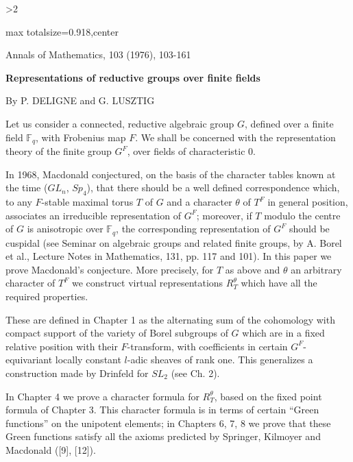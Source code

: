 \documentclass[9pt,twoside]{extarticle}
\newcommand{\EditionHeading}[1]{\par\medskip{\noindent\centering\large\bfseries #1\par}\smallskip}
\newcommand{\EditionPage}[3]{%
  \ifnum#1>2\clearpage\fi
  \pdfbookmark[1]{Printed page #2}{en-folio-#2}%
  \hypertarget{en-physical-#1}{}%
  \noindent\begin{adjustbox}{max totalsize={\textwidth}{0.918\textheight},center}
  \begin{minipage}[t]{\textwidth}
  \fontsize{9.4}{11.1}\selectfont\justifying
  #3
  \end{minipage}
  \end{adjustbox}%
}
\begin{document}
\setcounter{page}{103}

\EditionPage{2}{103}{%
\begin{center}\footnotesize Annals of Mathematics, 103 (1976), 103-161\end{center}

\begin{center}\fontsize{14.5}{16.5}\selectfont\bfseries Representations of reductive groups over finite fields\end{center}

\begin{center}\large By P. DELIGNE and G. LUSZTIG\end{center}

\EditionHeading{Introduction}

Let us consider a connected, reductive algebraic group \(G\), defined over a finite field \(\mathbb{F}_q\), with Frobenius map \(F\). We shall be concerned with the representation theory of the finite group \(G^F\), over fields of characteristic 0.\par

In 1968, Macdonald conjectured, on the basis of the character tables known at the time (\(GL_n\), \(Sp_4\)), that there should be a well defined correspondence which, to any \(F\)-stable maximal torus \(T\) of \(G\) and a character \(\theta\) of \(T^F\) in general position, associates an irreducible representation of \(G^F\); moreover, if \(T\) modulo the centre of \(G\) is anisotropic over \(\mathbb{F}_q\), the corresponding representation of \(G^F\) should be cuspidal (see Seminar on algebraic groups and related finite groups, by A. Borel et al., Lecture Notes in Mathematics, 131, pp. 117 and 101). In this paper we prove Macdonald's conjecture. More precisely, for \(T\) as above and \(\theta\) an arbitrary character of \(T^F\) we construct virtual representations \(R_T^\theta\) which have all the required properties.\par

These are defined in Chapter 1 as the alternating sum of the cohomology with compact support of the variety of Borel subgroups of \(G\) which are in a fixed relative position with their \(F\)-transform, with coefficients in certain \(G^F\)-equivariant locally constant \(l\)-adic sheaves of rank one. This generalizes a construction made by Drinfeld for \(SL_2\) (see Ch. 2).\par

In Chapter 4 we prove a character formula for \(R_T^\theta\), based on the fixed point formula of Chapter 3. This character formula is in terms of certain “Green functions” on the unipotent elements; in Chapters 6, 7, 8 we prove that these Green functions satisfy all the axioms predicted by Springer, Kilmoyer and Macdonald ([9], [12]).\par

}
\end{document}
